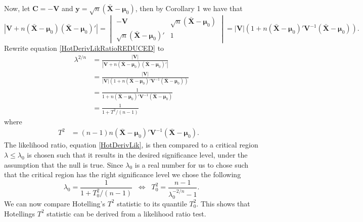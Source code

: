 Now, let $\mathbf{C}=-\mathbf{V}$ and $\mathbf{y}=\sqrt{n}(\bar{\mathbf{X}}-\boldsymbol{\mu}_0)$, then by Corollary 1 we have that 
$$
|\mathbf{V}+n(\bar{\mathbf{X}}-\boldsymbol{\mu}_0)(\bar{\mathbf{X}}-\boldsymbol{\mu}_0)'| = \begin{vmatrix}
-\mathbf{V} & \sqrt{n}(\bar{\mathbf{X}}-\boldsymbol{\mu}_0) \\
\sqrt{n}(\bar{\mathbf{X}}-\boldsymbol{\mu}_0)' & 1
\end{vmatrix} = |\mathbf{V}|(1+n(\bar{\mathbf{X}}-\boldsymbol{\mu}_0)'\mathbf{V}^{-1}(\bar{\mathbf{X}}-\boldsymbol{\mu}_0)).
$$
Rewrite equation \eqref{HotDerivLikRatioREDUCED} to
\begin{align}
\lambda^{2/n} &= \frac{|\mathbf{V}|}{|\mathbf{V}+n(\bar{\mathbf{X}}-\boldsymbol{\mu}_0)(\bar{\mathbf{X}}-\boldsymbol{\mu}_0)'|} \nonumber \\ 
&= \frac{|\mathbf{V}|}{|\mathbf{V}|(1+n(\bar{\mathbf{X}}-\boldsymbol{\mu}_0)'\mathbf{V}^{-1}(\bar{\mathbf{X}}-\boldsymbol{\mu}_0))}  \nonumber \\
&= \frac{1}{1+n(\bar{\mathbf{X}}-\boldsymbol{\mu}_0)'\mathbf{V}^{-1}(\bar{\mathbf{X}}-\boldsymbol{\mu}_0)}  \nonumber \\
&= \frac{1}{1+T^2/(n-1)} \label{HotDerivLik} 
\end{align}
where 
\begin{align*}
T^2&=(n-1)n(\bar{\mathbf{X}}-\boldsymbol{\mu}_0)'\mathbf{V}^{-1}(\bar{\mathbf{X}}-\boldsymbol{\mu}_0).& 
\end{align*}
The likelihood ratio, equation \eqref{HotDerivLik}, is then compared to a critical region $\lambda\leq\lambda_0$ is chosen such that it results in the desired significance level, under the assumption that the null is true. Since $\lambda_0$ is a real number for us to chose such that the critical region has the right significance level we chose the following 
$$
\lambda_0= \frac{1}{1+T_0^2/(n-1)}\;\; \iff \;\; T_0^2 = \frac{n-1}{ \lambda_0^{-2/n}-1}.
$$
We can now compare Hotelling's $T^2$ statistic to its quantile $T^2_0$. This shows that Hotellings $T^2$ statistic can be derived from a likelihood ratio test. 